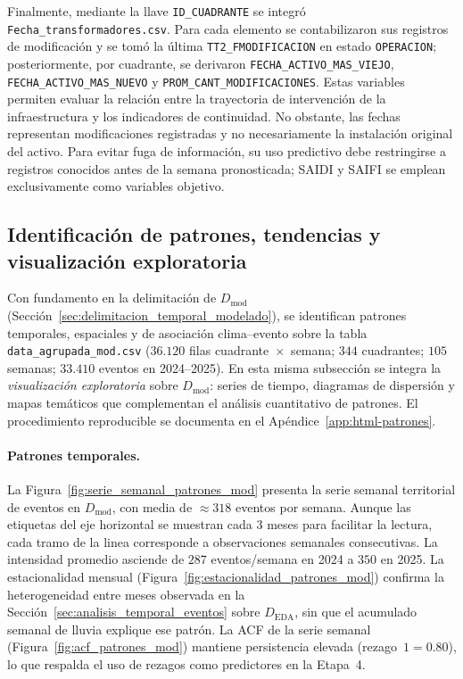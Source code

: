     Finalmente, mediante la llave \texttt{ID\_CUADRANTE} se integró
    \texttt{Fecha\_transformadores.csv}. Para cada elemento se contabilizaron
    sus registros de modificación y se tomó la última
    \texttt{TT2\_FMODIFICACION} en estado \texttt{OPERACION}; posteriormente,
    por cuadrante, se derivaron \texttt{FECHA\_ACTIVO\_MAS\_VIEJO},
    \texttt{FECHA\_ACTIVO\_MAS\_NUEVO} y
    \texttt{PROM\_CANT\_MODIFICACIONES}. Estas variables permiten evaluar la
    relación entre la trayectoria de intervención de la infraestructura y los
    indicadores de continuidad. No obstante, las fechas representan
    modificaciones registradas y no necesariamente la instalación original
    del activo. Para evitar fuga de información, su uso predictivo debe
    restringirse a registros conocidos antes de la semana pronosticada;
    SAIDI y SAIFI se emplean exclusivamente como variables objetivo.

\subsection{Identificación de patrones, tendencias y visualización exploratoria}
\label{sec:identificacion_patrones_tendencias}
    Con fundamento en la delimitación de $D_{\mathrm{mod}}$ (Sección~\ref{sec:delimitacion_temporal_modelado}), se identifican patrones temporales, espaciales y de asociación clima--evento sobre la tabla \texttt{data\_agrupada\_mod.csv} ($36{.}120$ filas cuadrante~$\times$~semana; $344$ cuadrantes; $105$ semanas; $33{.}410$ eventos en 2024--2025). En esta misma subsección se integra la \textit{visualización exploratoria} sobre $D_{\mathrm{mod}}$: series de tiempo, diagramas de dispersión y mapas temáticos que complementan el análisis cuantitativo de patrones. El procedimiento reproducible se documenta en el Apéndice~\ref{app:html-patrones}.
    
    \paragraph{Patrones temporales.} La Figura~\ref{fig:serie_semanal_patrones_mod} presenta la serie semanal territorial de eventos en $D_{\mathrm{mod}}$, con media de $\approx 318$ eventos por semana. Aunque las etiquetas del eje horizontal se muestran cada 3 meses para facilitar la lectura, cada tramo de la linea corresponde a observaciones semanales consecutivas. La intensidad promedio asciende de $287$ eventos/semana en 2024 a $350$ en 2025. La estacionalidad mensual (Figura~\ref{fig:estacionalidad_patrones_mod}) confirma la heterogeneidad entre meses observada en la Sección~\ref{sec:analisis_temporal_eventos} sobre $D_{\mathrm{EDA}}$, sin que el acumulado semanal de lluvia explique ese patrón. La ACF de la serie semanal (Figura~\ref{fig:acf_patrones_mod}) mantiene persistencia elevada (rezago~$1 = 0{.}80$), lo que respalda el uso de rezagos como predictores en la Etapa~4.
    
